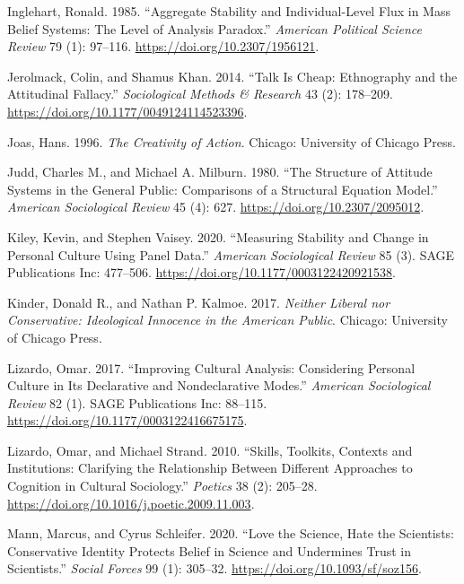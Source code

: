 \documentclass[12pt,]{article}
\begin{document}
\leavevmode\hypertarget{ref-inglehart1985}{}%
Inglehart, Ronald. 1985. ``Aggregate Stability and Individual-Level Flux in Mass Belief Systems: The Level of Analysis Paradox.'' \emph{American Political Science Review} 79 (1): 97--116. \url{https://doi.org/10.2307/1956121}.

\leavevmode\hypertarget{ref-jerolmack2014}{}%
Jerolmack, Colin, and Shamus Khan. 2014. ``Talk Is Cheap: Ethnography and the Attitudinal Fallacy.'' \emph{Sociological Methods \& Research} 43 (2): 178--209. \url{https://doi.org/10.1177/0049124114523396}.

\leavevmode\hypertarget{ref-joas1996}{}%
Joas, Hans. 1996. \emph{The Creativity of Action}. Chicago: University of Chicago Press.

\leavevmode\hypertarget{ref-judd1980}{}%
Judd, Charles M., and Michael A. Milburn. 1980. ``The Structure of Attitude Systems in the General Public: Comparisons of a Structural Equation Model.'' \emph{American Sociological Review} 45 (4): 627. \url{https://doi.org/10.2307/2095012}.

\leavevmode\hypertarget{ref-kiley2020}{}%
Kiley, Kevin, and Stephen Vaisey. 2020. ``Measuring Stability and Change in Personal Culture Using Panel Data.'' \emph{American Sociological Review} 85 (3). SAGE Publications Inc: 477--506. \url{https://doi.org/10.1177/0003122420921538}.

\leavevmode\hypertarget{ref-kinder2017}{}%
Kinder, Donald R., and Nathan P. Kalmoe. 2017. \emph{Neither Liberal nor Conservative: Ideological Innocence in the American Public}. Chicago: University of Chicago Press.

\leavevmode\hypertarget{ref-lizardo2017}{}%
Lizardo, Omar. 2017. ``Improving Cultural Analysis: Considering Personal Culture in Its Declarative and Nondeclarative Modes.'' \emph{American Sociological Review} 82 (1). SAGE Publications Inc: 88--115. \url{https://doi.org/10.1177/0003122416675175}.

\leavevmode\hypertarget{ref-lizardo2010a}{}%
Lizardo, Omar, and Michael Strand. 2010. ``Skills, Toolkits, Contexts and Institutions: Clarifying the Relationship Between Different Approaches to Cognition in Cultural Sociology.'' \emph{Poetics} 38 (2): 205--28. \url{https://doi.org/10.1016/j.poetic.2009.11.003}.

\leavevmode\hypertarget{ref-mann2020}{}%
Mann, Marcus, and Cyrus Schleifer. 2020. ``Love the Science, Hate the Scientists: Conservative Identity Protects Belief in Science and Undermines Trust in Scientists.'' \emph{Social Forces} 99 (1): 305--32. \url{https://doi.org/10.1093/sf/soz156}.
\end{document}
